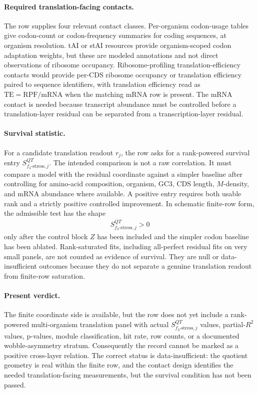\paragraph{Required translation-facing contacts.}
The row supplies four relevant contact classes.  Per-organism codon-usage tables give codon-count or codon-frequency summaries for coding sequences, at organism resolution.  tAI or stAI resources provide organism-scoped codon adaptation weights, but these are modeled annotations and not direct observations of ribosome occupancy.  Ribosome-profiling translation-efficiency contacts would provide per-CDS ribosome occupancy or translation efficiency paired to sequence identifiers, with translation efficiency read as $\mathrm{TE}=\mathrm{RPF}/\mathrm{mRNA}$ when the matching mRNA row is present.  The mRNA contact is needed because transcript abundance must be controlled before a translation-layer residual can be separated from a transcription-layer residual.

\paragraph{Survival statistic.}
For a candidate translation readout $r_j$, the row asks for a rank-powered survival entry $S^{QT}_{f_3\text{-stress},j}$.  The intended comparison is not a raw correlation.  It must compare a model with the residual coordinate against a simpler baseline after controlling for amino-acid composition, organism, GC3, CDS length, $M$-density, and mRNA abundance where available.  A positive entry requires both usable rank and a strictly positive controlled improvement.  In schematic finite-row form, the admissible test has the shape
$$
\begin{aligned}
S^{QT}_{f_3\text{-stress},j} > 0
\end{aligned}
$$
only after the control block $Z$ has been included and the simpler codon baseline has been ablated.  Rank-saturated fits, including all-perfect residual fits on very small panels, are not counted as evidence of survival.  They are null or data-insufficient outcomes because they do not separate a genuine translation readout from finite-row saturation.

\paragraph{Present verdict.}
The finite coordinate side is available, but the row does not yet include a rank-powered multi-organism translation panel with actual $S^{QT}_{f_3\text{-stress},j}$ values, partial-$R^2$ values, p-values, module classification, hit rate, row counts, or a documented wobble-asymmetry stratum.  Consequently the record cannot be marked as a positive cross-layer relation.  The correct status is data-insufficient: the quotient geometry is real within the finite row, and the contact design identifies the needed translation-facing measurements, but the survival condition has not been passed.

